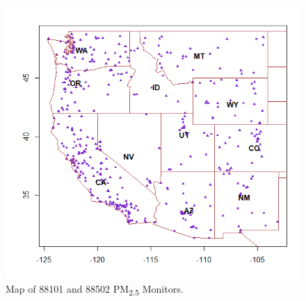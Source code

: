 \begin{figure}[H] %
\includegraphics[width=1\textwidth]{m88101and88502notitlenorlabels.PNG} %
\caption{\label{fig:MapLocations}Map of 88101 and 88502 PM\textsubscript{2.5} Monitors.} %
\end{figure} %
